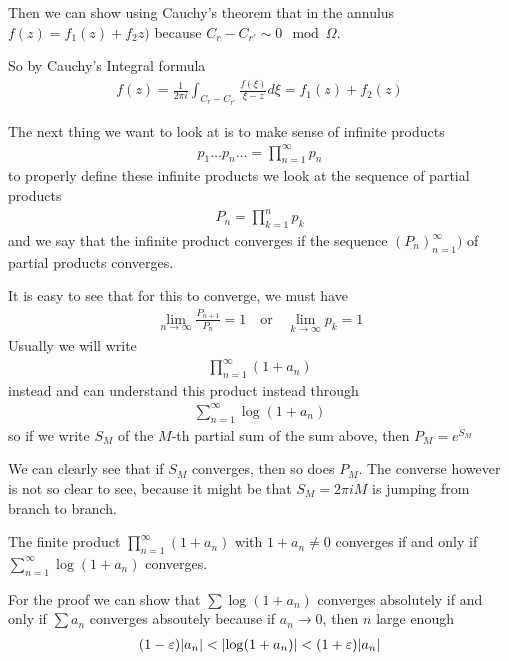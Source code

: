 Then we can show using Cauchy's theorem that in the annulus $f(z) = f_1(z) + f_2z)$ because $C_r - C_{r'} \sim 0 \mod \Omega$.

So by Cauchy's Integral formula
\begin{align*}
	f(z) = \frac{1}{2\pi i} \int_{C_r - C_{r'}} \frac{f(\xi)}{\xi - z}d \xi = f_1(z) + f_2(z)
\end{align*}

The next thing we want to look at is to make sense of infinite products
\begin{align*}
	p_{1} \dots p_{n} \dots = \prod_{n = 1}^{\infty}p_n
\end{align*}
to properly define these infinite products we look at the sequence of partial products
\begin{align*}
	P_n = \prod_{k = 1}^{n} p_k
\end{align*}
and we say that the infinite product converges if the sequence $\left(P_{n}\right)_{n = 1}^{\infty})$ of partial products converges.


It is easy to see that for this to converge, we must have
\begin{align*}
	\lim_{n \to \infty} \frac{P_{n+1}}{P_n} = 1 \quad \text{or} \quad \lim_{k \to \infty} p_k = 1
\end{align*}
Usually we will write
\begin{align*}
	\prod_{n= 1}^{\infty} (1 + a_n)
\end{align*}
instead and can understand this product instead through
\begin{align*}
	\sum_{n=1}^{\infty}\log(1 + a_n) 
\end{align*}
so if we write $S_M$ of the $M$-th partial sum of the sum above, then $P_M = e^{S_M}$


We can clearly see that if $S_M$ converges, then so does $P_M$. The converse however is not so clear to see, because it might be that $S_M = 2\pi i M$ is jumping from branch to branch.

\begin{theorem}[]
	The finite product $\prod_{n=1}^{\infty}(1 + a_n)$ with $1 + a_n \neq 0$ converges if and only if $\sum_{n=1}^{\infty}\log(1 + a_n)$ converges.
\end{theorem}
For the proof we can show that
$ \sum \log(1 + a_n)$ converges absolutely if and only if $\sum a_n$ converges absoutely because if $a_n \to 0$, then $n$ large enough
\begin{align*}
	(1 - \epsilon) \abs{a_n} < \abs{\log(1 + a_n)} < (1 + \epsilon) \abs{a_n}
\end{align*}

